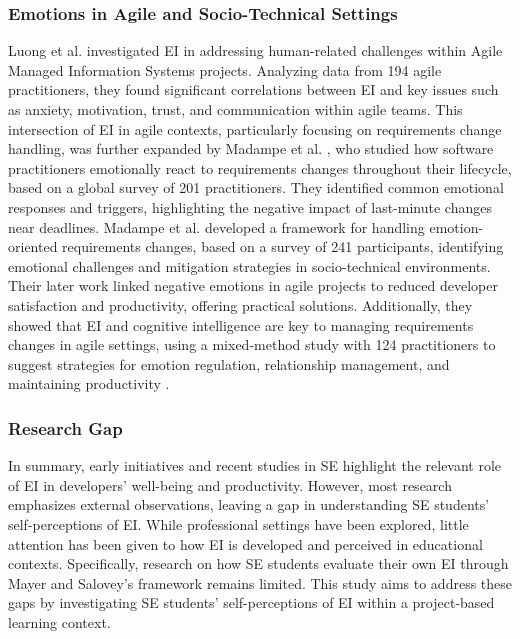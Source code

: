 \subsubsection{Emotions in Agile and Socio-Technical Settings} Luong et al. \cite{luong2021agile} investigated EI in addressing human-related challenges within Agile Managed Information Systems projects. Analyzing data from 194 agile practitioners, they found significant correlations between EI and key issues such as anxiety, motivation, trust, and communication within agile teams. This intersection of EI in agile contexts, particularly focusing on requirements change handling, was further expanded by Madampe et al. \cite{madampe2022emotional}, who studied how software practitioners emotionally react to requirements changes throughout their lifecycle, based on a global survey of 201 practitioners. They identified common emotional responses and triggers,  highlighting the negative impact of last-minute changes near deadlines. Madampe et al. \cite{madampe2023framework} developed a framework for handling emotion-oriented requirements changes, based on a survey of 241 participants, identifying emotional challenges and mitigation strategies in socio-technical environments. Their later work linked negative emotions in agile projects to reduced developer satisfaction and productivity, offering practical solutions. Additionally, they showed that EI and cognitive intelligence are key to managing requirements changes in agile settings, using a mixed-method study with 124 practitioners to suggest strategies for emotion regulation, relationship management, and maintaining productivity \cite{madampe2024supporting}.


\subsubsection{Research Gap} 
In summary, early initiatives and recent studies in SE highlight the relevant role of EI in developers' well-being and productivity. However, most research emphasizes external observations, leaving a gap in understanding SE students' self-perceptions of EI. While professional settings have been explored, little attention has been given to how EI is developed and perceived in educational contexts. Specifically, research on how SE students evaluate their own EI through Mayer and Salovey's framework \cite{mayer1997emotional} remains limited. This study aims to address these gaps by investigating SE students' self-perceptions of EI within a project-based learning context.